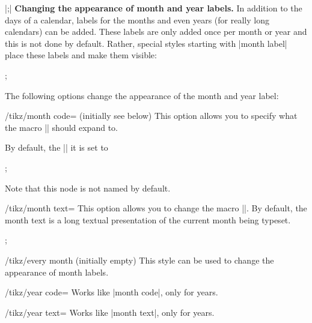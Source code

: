 \begin{command}{\calendar {}|;|}
  \medskip
  \textbf{Changing the appearance of month and year labels.}
  In addition to the days of a calendar, labels for the months and
  even years (for really long calendars) can be added. These labels
  are only added once per month or year and this is not done by
  default. Rather, special styles starting with |month label|
  place these labels and make them visible:
\begin{codeexample}[]
\tikz \calendar[dates=2000-01-01 to 2000-02-last,week list,
                month label above centered];
\end{codeexample}

  The following options change the appearance of the month and year
  label:
  \begin{key}{/tikz/month code= (initially \normalfont see below)}
    This option allows you to specify what the macro |\tikzmonthcode|
    should expand to.

    By default, the |\tikzmonthcode| it is set to
\begin{codeexample}
;
\end{codeexample}
    Note that this node is not named by default.
  \end{key}

  \begin{key}{/tikz/month text=}
    This option allows you to change the macro |\tikzmonthtext|. By
    default, the month text is a long textual presentation of the
    current month being typeset. 
\begin{codeexample}
\tikz \calendar[dates=2000-01-01 to 2000-01-31,week list,
                month label above centered,  
                month text=\textcolor{red}{\%mt} \%y-];
\end{codeexample}
  \end{key}

  \begin{stylekey}{/tikz/every month (initially \normalfont empty)}
    This style can be used to change the
    appearance of month labels.
  \end{stylekey}

  \begin{key}{/tikz/year code=}
    Works like |month code|, only for years.
  \end{key}

  \begin{key}{/tikz/year text=}
    Works like |month text|, only for years.
  \end{key}



\end{command}

